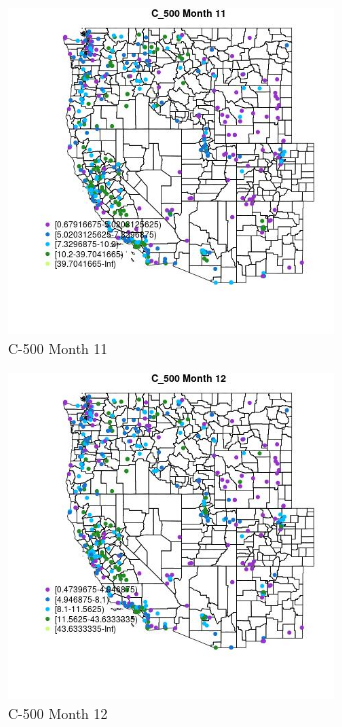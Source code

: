 \begin{figure} 
\centering  
\includegraphics[width=0.77\textwidth]{Code_Outputs/ML_input_report_ML_input_PM25_Step5_part_d_de_duplicated_aves_ML_input_MapObsMo11C_500.jpg} 
\caption{\label{fig:ML_input_report_ML_input_PM25_Step5_part_d_de_duplicated_aves_ML_inputMapObsMo11C_500}C-500 Month 11} 
\end{figure} 
 

\begin{figure} 
\centering  
\includegraphics[width=0.77\textwidth]{Code_Outputs/ML_input_report_ML_input_PM25_Step5_part_d_de_duplicated_aves_ML_input_MapObsMo12C_500.jpg} 
\caption{\label{fig:ML_input_report_ML_input_PM25_Step5_part_d_de_duplicated_aves_ML_inputMapObsMo12C_500}C-500 Month 12} 
\end{figure} 
 

